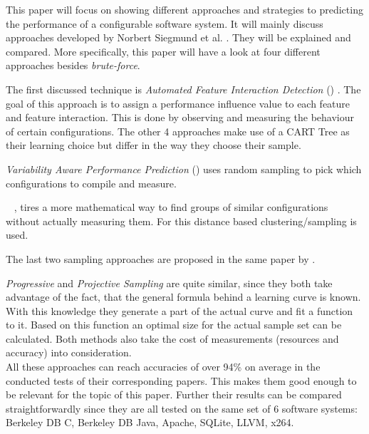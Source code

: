 This paper will focus on showing different approaches and strategies to predicting the performance of a configurable software system. It will mainly discuss approaches developed by Norbert Siegmund et al. \cite{AutomatedFeatureDetectionSiegmund2012,VariabilityAwarePerformancePredictionJianmeiSigmundApel, CostEfficientSampling_Gou_Siegmund_2015, DistanceBasedSampling2019}. They will be explained and compared. More specifically, this paper will have a look at four different approaches besides \textit{brute-force}.

The first discussed technique is \textit{Automated Feature Interaction Detection} (\AFID) \cite{AutomatedFeatureDetectionSiegmund2012}. The goal of this approach is to assign a performance influence value to each feature and feature interaction. This is done by observing and measuring the behaviour of certain configurations. 
The other 4 approaches make use of a CART Tree as their learning choice but differ in the way they choose their sample.
 
\textit{Variability Aware Performance Prediction} (\VAPP) \cite{VariabilityAwarePerformancePredictionJianmeiSigmundApel} uses random sampling to pick which configurations to compile and measure. 

\WHAT~ \cite{DistanceBasedSampling2019}, tires a more mathematical way to find groups of similar configurations without actually measuring them. For this distance based clustering/sampling is used. 

The last two sampling approaches are proposed in the same paper by \citet{CostEfficientSampling_Gou_Siegmund_2015}. 

\textit{Progressive} and \textit{Projective Sampling} are quite similar, since they both take advantage of the fact, that the general formula behind a learning curve is known. With this knowledge they generate a part of the actual curve and fit a function to it. Based on this function an optimal size for the actual sample set can be calculated. Both methods also take the cost of measurements (resources and accuracy) into consideration.\\
All these approaches can reach accuracies of over 94\% on average in the conducted tests of their corresponding papers. This makes them good enough to be relevant for the topic of this paper. Further their results can be compared straightforwardly since they are all tested on the same set of 6 software systems: Berkeley DB C, Berkeley DB Java, Apache, SQLite, LLVM, x264.